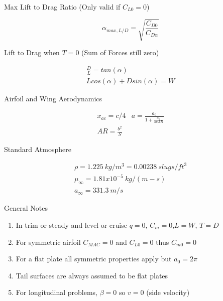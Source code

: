 \documentclass{article}
\def\beq{\begin{equation}}
\def\eeq{\end{equation}}
\def\beqn{\begin{matrix}}
\def\eeqn{\end{matrix}}
\begin{document}
\begin{multicols}{2}
\noindent Max Lift to Drag Ratio (Only valid if ${C_{L0}=0}$)

\beq
\alpha_{max,L/D} = \sqrt{\frac{C_{D0}}{C_{D\alpha}}}
\eeq

\noindent Lift to Drag when $T=0$ (Sum of Forces still zero)

\beq
\beqn
\frac{D}{L} = tan(\alpha)\\ %
Lcos(\alpha) + Dsin(\alpha) = W
\eeqn
\eeq

\noindent Airfoil and Wing Aerodynamics

\beq
\beqn
x_{ac} = c/4 & 
a = \frac{a_0}{1+\frac{a_0}{\pi e AR}} \\
AR = \frac{b^2}{S}
\eeqn
\eeq


\noindent Standard Atmosphere

\beq
\beqn
\rho = 1.225~kg/m^3 = 0.00238~slugs/ft^3\\
\mu_{\infty} = 1.81x10^{-5}~kg/(m-s)\\
a_{\infty} = 331.3~m/s
\eeqn
\eeq

\noindent General Notes

\begin{enumerate}
  \item In trim or steady and level or cruise $q=0$, $C_m=0$,$L=W$, $T=D$
  \item For symmetric airfoil $C_{MAC} = 0$ and
    $C_{L0}=0$ thus $C_{m0} = 0$
  \item For a flat plate all symmetric properties apply but
    $a_0 = 2\pi$
  \item Tail surfaces are always assumed to be flat plates
  \item For longitudinal problems, $\beta = 0$ so $v=0$ (side velocity)
\end{enumerate}

\end{multicols}




\end{document}
